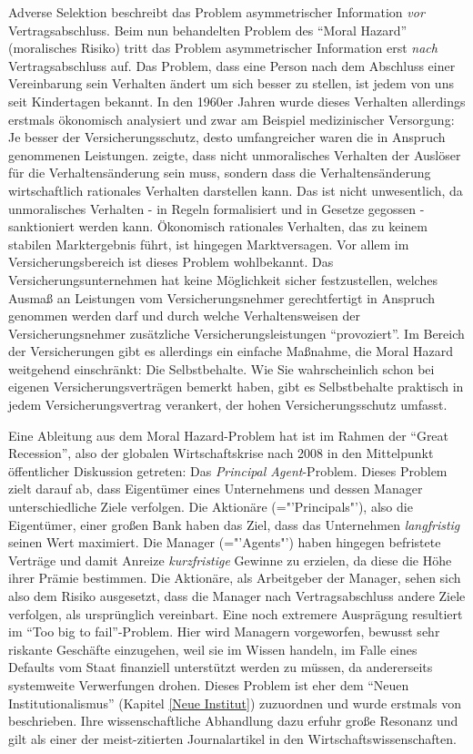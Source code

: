 Adverse Selektion beschreibt das Problem asymmetrischer Information \textit{vor} Vertragsabschluss. Beim nun behandelten Problem des "`Moral Hazard"' (moralisches Risiko) tritt das Problem asymmetrischer Information erst \textit{nach} Vertragsabschluss auf. Das Problem, dass eine Person nach dem Abschluss einer Vereinbarung sein Verhalten ändert um sich besser zu stellen, ist jedem von uns seit Kindertagen bekannt. In den 1960er Jahren wurde dieses Verhalten allerdings erstmals ökonomisch analysiert \parencite{Arrow1963, Dickerson1963} und zwar am Beispiel medizinischer Versorgung: Je besser der Versicherungsschutz, desto umfangreicher waren die in Anspruch genommenen Leistungen. \textcite{Pauly1968} zeigte, dass nicht unmoralisches Verhalten der Auslöser für die Verhaltensänderung sein muss, sondern dass die Verhaltensänderung wirtschaftlich rationales Verhalten darstellen kann. Das ist nicht unwesentlich, da unmoralisches Verhalten - in Regeln formalisiert und in Gesetze gegossen - sanktioniert werden kann. Ökonomisch rationales Verhalten, das zu keinem stabilen Marktergebnis führt, ist hingegen Marktversagen. Vor allem im Versicherungsbereich ist dieses Problem wohlbekannt. Das Versicherungsunternehmen hat keine Möglichkeit sicher festzustellen, welches Ausmaß an Leistungen vom Versicherungsnehmer gerechtfertigt in Anspruch genommen werden darf und durch welche Verhaltensweisen der Versicherungsnehmer zusätzliche Versicherungsleistungen "`provoziert"'. Im Bereich der Versicherungen gibt es allerdings ein einfache Maßnahme, die Moral Hazard weitgehend einschränkt: Die Selbstbehalte. Wie Sie wahrscheinlich schon bei eigenen Versicherungsverträgen bemerkt haben, gibt es Selbstbehalte praktisch in jedem Versicherungsvertrag verankert, der hohen Versicherungsschutz umfasst.

Eine Ableitung aus dem Moral Hazard-Problem hat ist im Rahmen der "`Great Recession"', also der globalen Wirtschaftskrise nach 2008 in den Mittelpunkt öffentlicher Diskussion getreten: Das \textit{Principal Agent}-Problem. Dieses Problem zielt darauf ab, dass Eigentümer eines Unternehmens und dessen Manager unterschiedliche Ziele verfolgen. Die Aktionäre (="'Principals"'), also die Eigentümer, einer großen Bank haben das Ziel, dass das Unternehmen \textit{langfristig} seinen Wert maximiert. Die Manager (="'Agents"') haben hingegen befristete Verträge und damit Anreize \textit{kurzfristige} Gewinne zu erzielen, da diese die Höhe ihrer Prämie bestimmen. Die Aktionäre, als Arbeitgeber der Manager, sehen sich also dem Risiko ausgesetzt, dass die Manager nach Vertragsabschluss andere Ziele verfolgen, als ursprünglich vereinbart. Eine noch extremere Ausprägung resultiert im "`Too big to fail"'-Problem. Hier wird Managern vorgeworfen, bewusst sehr riskante Geschäfte einzugehen, weil sie im Wissen handeln, im Falle eines Defaults vom Staat finanziell unterstützt werden zu müssen, da andererseits systemweite Verwerfungen drohen. Dieses Problem ist eher dem "`Neuen Institutionalismus"' (Kapitel \ref{Neue Institut}) zuzuordnen und wurde erstmals von \textcite{Jensen1976} beschrieben. Ihre wissenschaftliche Abhandlung dazu erfuhr große Resonanz und gilt als einer der meist-zitierten Journalartikel in den Wirtschaftswissenschaften.


